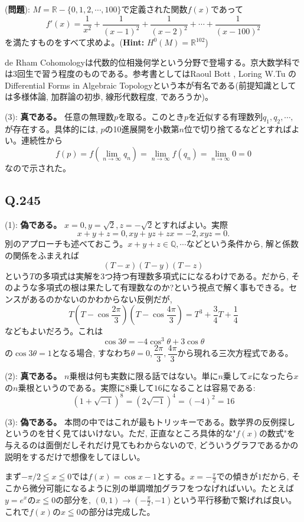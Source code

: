 \documentclass[twocolumn]{jbook}
\theoremstyle{definition}
\newcommand{\mb}{\mathbb}
\renewcommand{\leq}{\leqq}
\begin{document}
(\textbf{問題}): $M=\mb{R}-\{ 0,1,2,\cdots, 100 \}$で定義された関数$f(x)$であって
\[f'(x) = \dfrac{1}{x^2} + \dfrac{1}{(x-1)^2} + \dfrac{1}{(x-2)^2 }+ \cdots + \dfrac{1}{(x-100)^2}\]
を満たすものをすべて求めよ。(\textbf{Hint:} $H^{0}(M) = \mb{R}^{102}$)

de Rham Cohomologyは代数的位相幾何学という分野で登場する。京大数学科では3回生で習う程度のものである。参考書としてはRaoul Bott , Loring W.Tu のDifferential Forms in Algebraic Topologyという本が有名である(前提知識としては多様体論, 加群論の初歩, 線形代数程度, であろうか)。

(3): \textbf{真である。} 任意の無理数$p$を取る。このとき$p$を近似する有理数列$q_1,q_2,\cdots,$が存在する。具体的には, $p$の10進展開を小数第$n$位で切り捨てるなどとすればよい。連続性から
\[f(p) =  f(\lim_{n\to \infty}q_n) = \lim_{n\to \infty} f(q_n) = \lim_{n\to \infty} 0 = 0\]
なので示された。


\subsection{Q.245}
(1): \textbf{偽である。} $x=0, y=\sqrt{2}, z=-\sqrt{2}$とすればよい。実際
\[x+y+z = 0,  xy+yz+zx = -2, xyz = 0.\]
別のアプローチも述べておこう。$x+y+z\in \mb{Q},\cdots$などという条件から, 解と係数の関係をふまえれば
\[(T-x)(T-y)(T-z)\]
という$T$の多項式は実解を3つ持つ有理数多項式にになるわけである。だから, そのような多項式の根は果たして有理数なのか?という視点で解く事もできる。センスがあるのかないのかわからない反例だが,  
\[T(T-\cos{\dfrac{2\pi}{3}})(T-\cos{\dfrac{4\pi}{3}}) = T^3 + \dfrac{3}{4}T +\dfrac{1}{4}\]
などもよいだろう。これは
\[\cos{3\theta} = -4\cos^{3}{\theta} + 3\cos{\theta}\]
の$\cos{3\theta} = 1$となる場合, すなわち$\theta =0, \dfrac{2\pi}{3}, \dfrac{4\pi}{3}$から現れる三次方程式である。 

(2): \textbf{真である。} $n$乗根は何も実数に限る話ではない。単に$n$乗して$x$になったら$x$の$n$乗根というのである。実際に8乗して$16$になることは容易である:
\[(1+\sqrt{-1})^8 = (2\sqrt{-1})^{4} = (-4)^2  = 16\]

(3): \textbf{偽である。} 本問の中ではこれが最もトリッキーである。数学界の反例探しというのを甘く見てはいけない。ただ, 正直なところ具体的な"$f(x)$の数式"を与えるのは面倒だしそれだけ見てもわからないので, どういうグラフであるかの説明をするだけで想像をしてほしい。

まず$-\pi/2 \leq x\leq 0$では$f(x) = \cos{x} - 1$とする。$x=-\frac{\pi}{2}$での傾きが$1$だから, そこから微分可能になるように別の単調増加グラフをつなげればいい。たとえば$y=e^{x}$の$x\leq 0$の部分を, $(0,1)\to (-\frac{\pi}{2}, -1)$という平行移動で繋げれば良い。これで$f(x)$の$x\leq 0$の部分は完成した。
\end{document}
